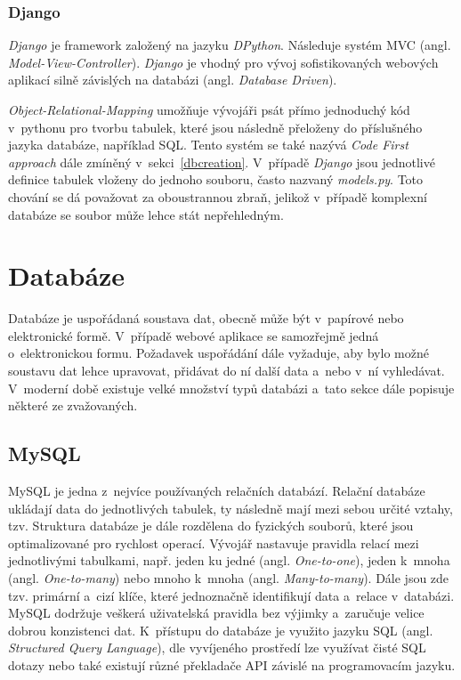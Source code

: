 \subsubsection{Django}
\emph{Django} je framework založený na jazyku \emph{DPython}. Následuje systém MVC (angl. \emph{Model-View-Controller}). \emph{Django} je vhodný pro vývoj sofistikovaných webových aplikací silně závislých na databázi (angl. \emph{Database Driven}).~\cite{bestbackend} 

\emph{Object-Relational-Mapping} umožňuje vývojáři psát přímo jednoduchý kód v~pythonu pro tvorbu tabulek, které jsou následně přeloženy do příslušného jazyka databáze, například SQL. Tento systém se také nazývá \emph{Code First approach} dále zmíněný v~sekci~\ref{dbcreation}. V~případě \emph{Django} jsou jednotlivé definice tabulek vloženy do jednoho souboru, často nazvaný \emph{models.py}. Toto chování se dá považovat za oboustrannou zbraň, jelikož v~případě komplexní databáze se soubor může lehce stát nepřehledným.~\cite{django} 
\section{Databáze}
Databáze je uspořádaná soustava dat, obecně může být v~papírové nebo elektronické formě. V~případě webové aplikace se samozřejmě jedná o~elektronickou formu. Požadavek uspořádání dále vyžaduje, aby bylo možné soustavu dat lehce upravovat, přidávat do ní další data a~nebo v~ní vyhledávat. V~moderní době existuje velké množství typů databázi a~tato sekce dále popisuje některé ze zvažovaných. \cite{database}

\subsection{MySQL}
MySQL je jedna z~nejvíce používaných relačních databází. Relační databáze ukládají data do jednotlivých tabulek, ty následně mají mezi sebou určité vztahy, tzv.  Struktura databáze je dále rozdělena do fyzických souborů, které jsou optimalizované pro rychlost operací. Vývojář nastavuje pravidla relací mezi jednotlivými tabulkami, např. jeden ku jedné (angl. \emph{One-to-one}), jeden k~mnoha (angl. \emph{One-to-many}) nebo mnoho k~mnoha (angl. \emph{Many-to-many}). Dále jsou zde tzv. primární a~cizí klíče, které jednoznačně identifikují data a~relace v~databázi. MySQL dodržuje veškerá uživatelská pravidla bez výjimky a~zaručuje velice dobrou konzistenci dat. K~přístupu do databáze je využito jazyku SQL (angl. \emph{Structured Query Language}), dle vyvíjeného prostředí lze využívat čisté SQL dotazy nebo také existují různé překladače API závislé na programovacím jazyku.    \cite{mysql}

